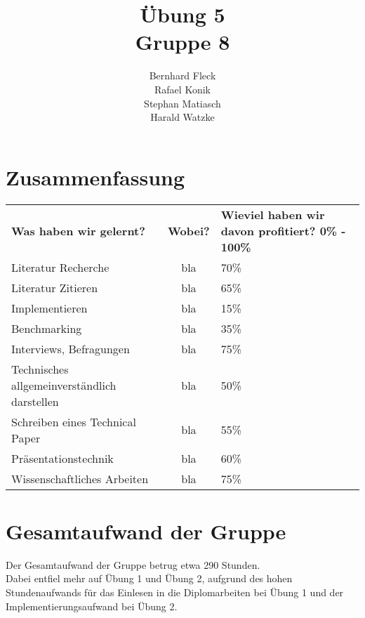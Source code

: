 \documentclass[11pt]{article} %
\title{Übung 5\\Gruppe 8}
\author{Bernhard Fleck\\Rafael Konik\\Stephan Matiasch\\Harald Watzke}
\begin{document}
\maketitle

\section{Zusammenfassung}

\begin{table}[!ht]
   \begin{center}
	\begin{tabular}{ m{5cm}  c  m{5cm} }
	\textbf{Was haben wir gelernt?} & \textbf{Wobei?} & \textbf{Wieviel haben wir davon profitiert? 0\% - 100\%}\\

	\centering Literatur Recherche & bla & 70\%\\\hline

	\centering Literatur Zitieren & bla &65\%\\\hline

	\centering Implementieren & bla & 15\%\\\hline

	\centering Benchmarking & bla & 35\%\\\hline

	\centering Interviews, Befragungen & bla & 75\%\\\hline

	\centering Technisches allgemeinverständlich darstellen & bla & 50\%\\\hline

	\centering Schreiben eines Technical Paper & bla & 55\%\\\hline

	\centering Präsentationstechnik & bla & 60\%\\\hline

	\centering Wissenschaftliches Arbeiten & bla & 75\%\\\hline
	\end{tabular}
   \end{center}
\end{table}

\section{Gesamtaufwand der Gruppe}

Der Gesamtaufwand der Gruppe betrug etwa 290 Stunden.\\ Dabei entfiel mehr auf Übung 1 und Übung 2, aufgrund des hohen Stundenaufwands für das Einlesen in die Diplomarbeiten bei Übung 1 und der Implementierungsaufwand bei Übung 2.
\end{document}
